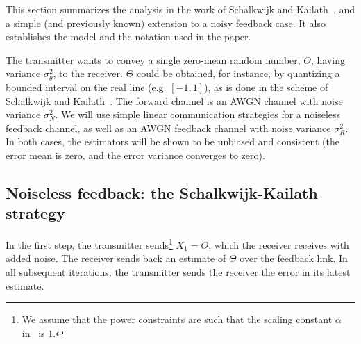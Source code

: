 \documentclass[letterpaper, 10pt, conference]{ieeeconf}
\begin{document}
This section summarizes the analysis in the work of Schalkwijk and Kailath~\cite{S&K}, and a simple (and previously known) extension to a noisy feedback case. It also establishes the model and the notation used in the paper.

The transmitter wants to convey a single zero-mean random number, $\Theta$, having variance
$\sigma_\theta^2$, to the receiver. $\Theta$ could be obtained, for instance, by quantizing a bounded interval on the real line (e.g. $[-1,1]$), as is done in the scheme of Schalkwijk and Kailath~\cite{S&K}. The forward channel is an AWGN channel with noise variance $\sigma_N^2$. We will use simple linear communication strategies for a noiseless feedback channel, as well as an AWGN feedback channel with noise variance $\sigma_R^2$. In both cases, the estimators will be shown to be unbiased and consistent (the error mean is zero, and the error variance converges to zero).


\subsection{Noiseless feedback: the Schalkwijk-Kailath strategy}
\label{sec:sk-noiseless}

 In the first step, the transmitter sends\footnote{We assume that the power constraints are such that the scaling constant $\alpha$ in~\cite{S&K} is $1$.} $X_1 = \Theta$, which the receiver receives with added noise. The receiver sends back an estimate of $\Theta$ over the feedback link. In all subsequent iterations, the transmitter sends the receiver the error in its latest estimate.
\end{document}
